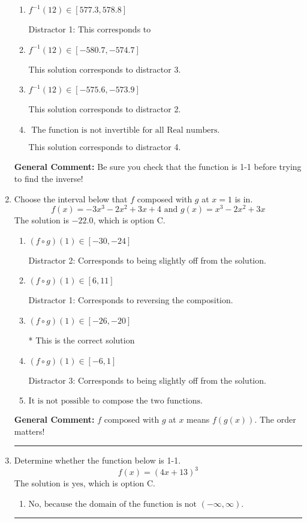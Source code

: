 \documentclass{extbook}[14pt]
\newcommand{\litem}[1]{\item #1

\rule{\textwidth}{0.4pt}}
\begin{document}
\begin{enumerate}
{\begin{enumerate}[label=\Alph*.]
* This is the correct solution.
\item \( f^{-1}(12) \in [577.3, 578.8] \)

 Distractor 1: This corresponds to 
\item \( f^{-1}(12) \in [-580.7, -574.7] \)

 This solution corresponds to distractor 3.
\item \( f^{-1}(12) \in [-575.6, -573.9] \)

 This solution corresponds to distractor 2.
\item \( \text{ The function is not invertible for all Real numbers. } \)

 This solution corresponds to distractor 4.
\end{enumerate}

\textbf{General Comment:} Be sure you check that the function is 1-1 before trying to find the inverse!
}
\litem{
Choose the interval below that $f$ composed with $g$ at $x=1$ is in.
\[ f(x) = -3x^{3} -2 x^{2} +3 x + 4 \text{ and } g(x) = x^{3} -2 x^{2} +3 x \]The solution is \( -22.0 \), which is option C.\begin{enumerate}[label=\Alph*.]
\item \( (f \circ g)(1) \in [-30, -24] \)

 Distractor 2: Corresponds to being slightly off from the solution.
\item \( (f \circ g)(1) \in [6, 11] \)

 Distractor 1: Corresponds to reversing the composition.
\item \( (f \circ g)(1) \in [-26, -20] \)

* This is the correct solution
\item \( (f \circ g)(1) \in [-6, 1] \)

 Distractor 3: Corresponds to being slightly off from the solution.
\item \( \text{It is not possible to compose the two functions.} \)


\end{enumerate}

\textbf{General Comment:} $f$ composed with $g$ at $x$ means $f(g(x))$. The order matters!
}
\litem{
Determine whether the function below is 1-1.
\[ f(x) = (4 x + 13)^3 \]The solution is \( \text{yes} \), which is option C.\begin{enumerate}[label=\Alph*.]
\item \( \text{No, because the domain of the function is not $(-\infty, \infty)$.} \)


\end{enumerate}}
\end{enumerate}
\end{document}
